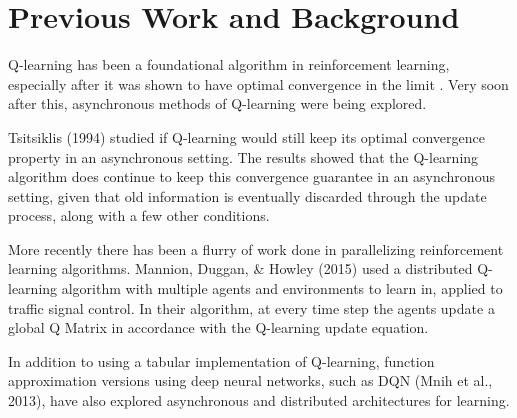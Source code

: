 \documentclass[jair,twoside,11pt,theapa]{article}
\begin{document}



\section{Previous Work and Background}
\label{Literature Survey}
Q-learning \cite{watkins} has been a foundational algorithm in reinforcement learning, especially after it was shown to have optimal convergence in the limit \cite{qlearning}. Very soon after this, asynchronous methods of Q-learning were being explored.  

Tsitsiklis (1994) \nocite{Tsitsiklis1994} studied if Q-learning would still keep its optimal convergence property in an asynchronous setting. The results showed that the Q-learning algorithm does continue to keep this convergence guarantee in an asynchronous setting, given that old information is eventually discarded through the update process, along with a few other conditions. 

More recently there has been a flurry of work done in parallelizing reinforcement learning algorithms. Mannion, Duggan, \& Howley (2015) \nocite{MANNION2015956} used a distributed Q-learning algorithm with multiple agents and environments to learn in, applied to traffic signal control. In their algorithm, at every time step the agents update a global Q Matrix in accordance with the Q-learning update equation. 

In addition to using a tabular implementation of Q-learning, function approximation versions using deep neural networks, such as DQN (Mnih et al., 2013), have also explored asynchronous and distributed architectures for learning. 
\end{document}
